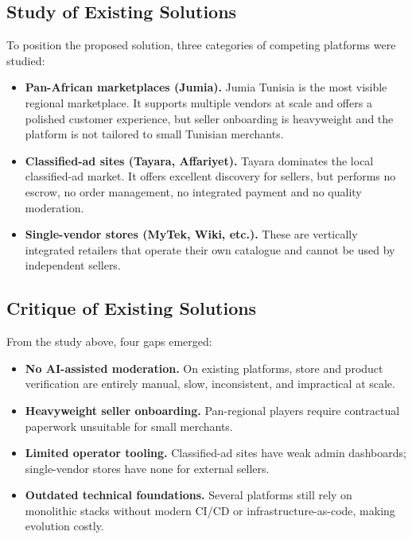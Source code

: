 \subsection{Study of Existing Solutions}

To position the proposed solution, three categories of competing
platforms were studied:

\begin{itemize}[leftmargin=*,itemsep=4pt]
  \item \textbf{Pan-African marketplaces (Jumia).} Jumia Tunisia is the
        most visible regional marketplace. It supports multiple vendors
        at scale and offers a polished customer experience, but seller
        onboarding is heavyweight and the platform is not tailored to
        small Tunisian merchants.
  \item \textbf{Classified-ad sites (Tayara, Affariyet).} Tayara
        dominates the local classified-ad market. It offers excellent
        discovery for sellers, but performs no escrow, no order
        management, no integrated payment and no quality moderation.
  \item \textbf{Single-vendor stores (MyTek, Wiki, etc.).} These are
        vertically integrated retailers that operate their own
        catalogue and cannot be used by independent sellers.
\end{itemize}

\subsection{Critique of Existing Solutions}

From the study above, four gaps emerged:

\begin{itemize}[leftmargin=*,itemsep=2pt]
  \item \textbf{No AI-assisted moderation.} On existing platforms,
        store and product verification are entirely manual, slow,
        inconsistent, and impractical at scale.
  \item \textbf{Heavyweight seller onboarding.} Pan-regional players
        require contractual paperwork unsuitable for small merchants.
  \item \textbf{Limited operator tooling.} Classified-ad sites have
        weak admin dashboards; single-vendor stores have none for
        external sellers.
  \item \textbf{Outdated technical foundations.} Several platforms still
        rely on monolithic stacks without modern CI/CD or
        infrastructure-as-code, making evolution costly.
\end{itemize}

